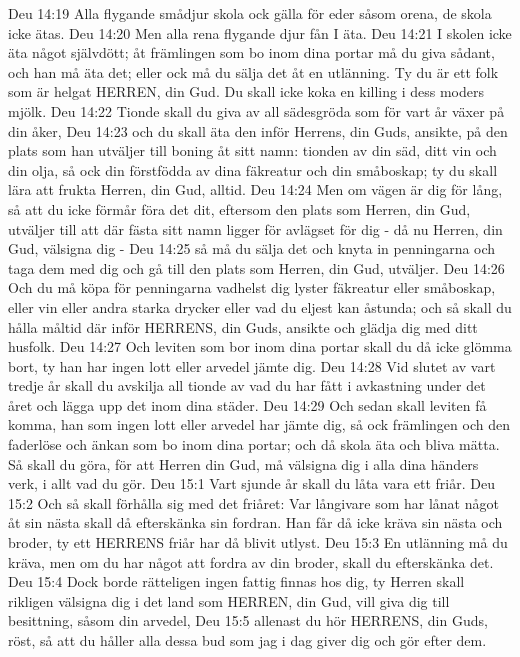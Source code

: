 Deu 14:19  Alla flygande smådjur skola ock gälla för eder såsom orena, de skola icke ätas.
Deu 14:20  Men alla rena flygande djur fån I äta.
Deu 14:21  I skolen icke äta något självdött; åt främlingen som bo inom dina portar må du giva sådant, och han må äta det; eller ock må du sälja det åt en utlänning. Ty du är ett folk som är helgat HERREN, din Gud. Du skall icke koka en killing i dess moders mjölk.
Deu 14:22  Tionde skall du giva av all sädesgröda som för vart år växer på din åker,
Deu 14:23  och du skall äta den inför Herrens, din Guds, ansikte, på den plats som han utväljer till boning åt sitt namn: tionden av din säd, ditt vin och din olja, så ock din förstfödda av dina fäkreatur och din småboskap; ty du skall lära att frukta Herren, din Gud, alltid.
Deu 14:24  Men om vägen är dig för lång, så att du icke förmår föra det dit, eftersom den plats som Herren, din Gud, utväljer till att där fästa sitt namn ligger för avlägset för dig - då nu Herren, din Gud, välsigna dig -
Deu 14:25  så må du sälja det och knyta in penningarna och taga dem med dig och gå till den plats som Herren, din Gud, utväljer.
Deu 14:26  Och du må köpa för penningarna vadhelst dig lyster fäkreatur eller småboskap, eller vin eller andra starka drycker eller vad du eljest kan åstunda; och så skall du hålla måltid där inför HERRENS, din Guds, ansikte och glädja dig med ditt husfolk.
Deu 14:27  Och leviten som bor inom dina portar skall du då icke glömma bort, ty han har ingen lott eller arvedel jämte dig.
Deu 14:28  Vid slutet av vart tredje år skall du avskilja all tionde av vad du har fått i avkastning under det året och lägga upp det inom dina städer.
Deu 14:29  Och sedan skall leviten få komma, han som ingen lott eller arvedel har jämte dig, så ock främlingen och den faderlöse och änkan som bo inom dina portar; och då skola äta och bliva mätta. Så skall du göra, för att Herren din Gud, må välsigna dig i alla dina händers verk, i allt vad du gör.
Deu 15:1  Vart sjunde år skall du låta vara ett friår.
Deu 15:2  Och så skall förhålla sig med det friåret: Var långivare som har lånat något åt sin nästa skall då efterskänka sin fordran. Han får då icke kräva sin nästa och broder, ty ett HERRENS friår har då blivit utlyst.
Deu 15:3  En utlänning må du kräva, men om du har något att fordra av din broder, skall du efterskänka det.
Deu 15:4  Dock borde rätteligen ingen fattig finnas hos dig, ty Herren skall rikligen välsigna dig i det land som HERREN, din Gud, vill giva dig till besittning, såsom din arvedel,
Deu 15:5  allenast du hör HERRENS, din Guds, röst, så att du håller alla dessa bud som jag i dag giver dig och gör efter dem.
